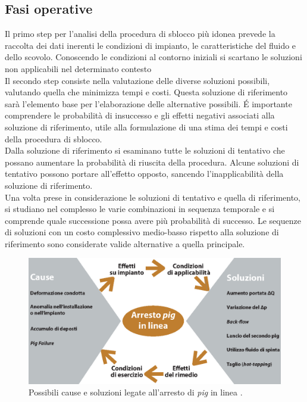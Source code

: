 \subsection{Fasi operative}
Il primo step per l'analisi della procedura di sblocco più idonea prevede la raccolta dei dati inerenti le condizioni di impianto, le caratteristiche del fluido e dello scovolo. Conoscendo le condizioni al contorno iniziali si scartano le soluzioni non applicabili nel determinato contesto\\
Il secondo step consiste nella valutazione delle diverse soluzioni possibili, valutando quella che minimizza tempi e costi. Questa soluzione di riferimento sarà l'elemento base per l'elaborazione delle alternative possibili. \'E importante comprendere le probabilità di insuccesso e gli effetti negativi associati alla soluzione di riferimento, utile alla formulazione di una stima dei tempi e costi della procedura di sblocco.\\
Dalla soluzione di riferimento si esaminano tutte le soluzioni di tentativo che possano aumentare la probabilità di riuscita della procedura. Alcune soluzioni di tentativo possono portare all'effetto opposto, sancendo l'inapplicabilità della soluzione di riferimento.\\
Una volta prese in considerazione le soluzioni di tentativo e quella di riferimento, si studiano nel complesso le varie combinazioni in sequenza temporale e si comprende quale successione possa avere più probabilità di successo. Le sequenze di soluzioni con un costo complessivo medio-basso rispetto alla soluzione di riferimento sono considerate valide alternative a quella principale.

\begin{figure}[htbp]
	\centering
	\includegraphics[width=\textwidth]{fig/pig/blocco.eps}
	\caption{Possibili cause e soluzioni legate all'arresto di \textit{pig} in linea \parencite{diluvio2006questione}.}
	\label{fig:bloccopig}
\end{figure}

